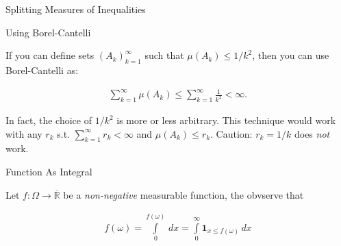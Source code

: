 \documentclass[10pt,landscape]{article}
\renewcommand{\leq}{\leqslant}
\newcommand{\Indicator}[1]{\mathbf{1}_{#1}}
\begin{document}
\begin{multicols}{3}
\begin{observation}{}{Splitting Measures of Inequalities}
\end{observation}

\begin{observation}{}{Using Borel-Cantelli}

    If you can define sets $(A_k)_{k=1}^{\infty}$ such that $\mu(A_k) \leq 1/k^2$, then you can use Borel-Cantelli as:

        \begin{align*}
            \sum_{k=1}^{\infty} \mu(A_k) \leq \sum_{k=1}^{\infty} \frac{1}{k^2} < \infty.
        \end{align*}

    In fact, the choice of $1/k^2$ is more or less arbitrary. This technique would work with any $r_k$ s.t. $\sum_{k=1}^{\infty} r_k < \infty$ and $\mu(A_k) \leq r_k$. Caution: $r_k = 1/k$ does \emph{not} work.

\end{observation}

\begin{observation}{}{Function As Integral}

    Let $f: \Omega \to \overline{\mathbb{R}}$ be a \emph{non-negative} measurable function, the obvserve that

        \begin{align*}
            f(\omega) = \int\limits_0^{f(\omega)} \, dx = \int\limits_0^{\infty} \Indicator{x \leq f(\omega)} \, dx
        \end{align*}

\end{observation}

\end{multicols}
\end{document}

